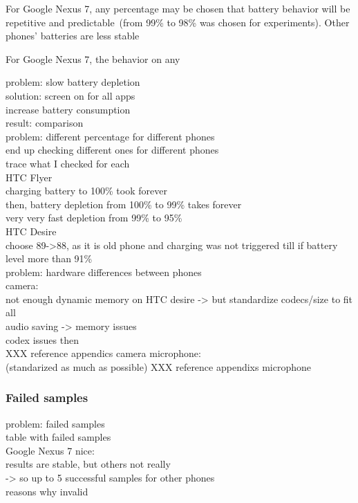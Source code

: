For Google Nexus 7, any percentage may be chosen that battery behavior will be repetitive and predictable\ (from 99\% to 98\% was chosen for experiments). Other phones' batteries are less stable 

For Google Nexus 7, the behavior on any 

problem: slow battery depletion\\
	solution: screen on for all apps\\
		increase battery consumption\\
	result: comparison\\
	
problem: different percentage for different phones\\
	end up checking different ones for different phones\\
		trace what I checked for each\\
		HTC Flyer\\
			charging battery to 100\% took forever\\
			then, battery depletion from 100\% to 99\% takes forever\\
			very very fast depletion from 99\% to 95\%\\
		HTC Desire\\
			choose 89->88, as it is old phone and charging was not triggered till if battery level more than 91\%\\
		
problem: hardware differences between phones\\
	camera:\\
		not enough dynamic memory on HTC desire -> but standardize codecs/size to fit all\\
		audio saving -> memory issues\\
			codex issues then\\
			XXX reference appendics camera
	microphone:\\
		(standarized as much as possible)
		XXX reference appendixs microphone
			
\subsubsection{Failed samples}
problem: failed samples\\
	table with failed samples\\
	Google Nexus 7 nice:\\
		results are stable, but others not really\\
			-> so up to 5 successful samples for other phones\\
	reasons why invalid\\
	
